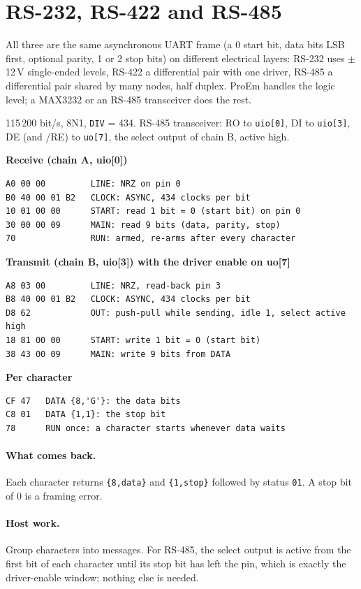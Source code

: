 \documentclass[11pt,a4paper]{article}
\newcommand{\sig}[1]{\texttt{#1}}
\newcommand{\progtitle}[1]{\par\smallskip\textbf{\small\color{accent}#1}\par\nopagebreak}
\newcommand{\facts}[1]{\par\noindent\colorbox{codebg}{\parbox{\dimexpr\linewidth-2\fboxsep}{\small #1}}\par}
\begin{document}
\section{RS-232, RS-422 and RS-485}
All three are the same asynchronous UART frame (a 0 start bit, data bits LSB first, optional parity, 1 or 2 stop bits) on different electrical layers: RS-232 uses $\pm$12\,V single-ended levels, RS-422 a differential pair with one driver, RS-485 a differential pair shared by many nodes, half duplex. ProEm handles the logic level; a MAX3232 or an RS-485 transceiver does the rest.
\facts{115\,200 bit/s, 8N1, \sig{DIV} = 434. RS-485 transceiver: RO to \sig{uio[0]}, DI to \sig{uio[3]}, DE (and /RE) to \sig{uo[7]}, the select output of chain B, active high.}
\progtitle{Receive (chain A, uio[0])}
\begin{lstlisting}
A0 00 00         LINE: NRZ on pin 0
B0 40 00 01 B2   CLOCK: ASYNC, 434 clocks per bit
10 01 00 00      START: read 1 bit = 0 (start bit) on pin 0
30 00 00 09      MAIN: read 9 bits (data, parity, stop)
70               RUN: armed, re-arms after every character
\end{lstlisting}
\progtitle{Transmit (chain B, uio[3]) with the driver enable on uo[7]}
\begin{lstlisting}
A8 03 00         LINE: NRZ, read-back pin 3
B8 40 00 01 B2   CLOCK: ASYNC, 434 clocks per bit
D8 62            OUT: push-pull while sending, idle 1, select active high
18 81 00 00      START: write 1 bit = 0 (start bit)
38 43 00 09      MAIN: write 9 bits from DATA
\end{lstlisting}
\progtitle{Per character}
\begin{lstlisting}
CF 47   DATA {8,'G'}: the data bits
C8 01   DATA {1,1}: the stop bit
78      RUN once: a character starts whenever data waits
\end{lstlisting}
\paragraph{What comes back.} Each character returns \texttt{\{8,data\}} and \texttt{\{1,stop\}} followed by status \texttt{01}. A stop bit of 0 is a framing error.

\paragraph{Host work.} Group characters into messages. For RS-485, the select output is active from the first bit of each character until its stop bit has left the pin, which is exactly the driver-enable window; nothing else is needed.
\end{document}
